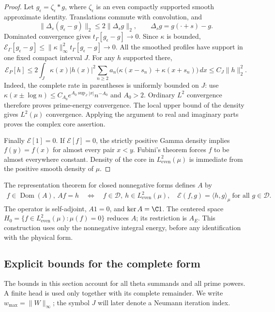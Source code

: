 \documentclass[11pt,a4paper]{article}
\numberwithin{equation}{section}
\theoremstyle{definition}\newtheorem{definition}[theorem]{Definition}
\theoremstyle{remark}\newtheorem{remark}[theorem]{Remark}
\newcommand{\E}{\mathcal E}\newcommand{\D}{\mathcal D}
\newcommand{\He}{L^2_{\mathrm{even}}(\mu)}\newcommand{\Le}{L^2_{\mathrm{even}}(dx)}
\newcommand{\tg}{t_\Gamma}\newcommand{\cg}{c_\Gamma}
\newcommand{\dom}{\operatorname{Dom}}\newcommand{\Var}{\operatorname{Var}}
\newcommand{\ip}[2]{\langle#1,#2\rangle}\newcommand{\norm}[1]{\lVert#1\rVert}\newcommand{\abs}[1]{\lvert#1\rvert}
\begin{document}
\begin{proof}
Let $g_\epsilon=\zeta_\epsilon*g$, where $\zeta_\epsilon$ is an even compactly supported smooth approximate identity. Translations commute with convolution, and
\[
 \norm{\Delta_s(g_\epsilon-g)}_2\le2\norm{\Delta_sg}_2,
 \qquad\Delta_sg=g(\cdot+s)-g.
\]
Dominated convergence gives $\tg[g_\epsilon-g]\to0$. Since $\kappa$ is bounded,
$\E_\Gamma[g_\epsilon-g]\le\norm{\kappa}_\infty^2\tg[g_\epsilon-g]\to0$.
All the smoothed profiles have support in one fixed compact interval $J$. For any $h$ supported there,
\begin{equation}\label{a:eq:compactprimerate}
 \E_P[h]\le2\int_J\kappa(x)|h(x)|^2
     \sum_{n\ge2}a_n\bigl(\kappa(x-s_n)+\kappa(x+s_n)\bigr)\,dx
 \le C_J\norm{h}_2^2.
\end{equation}
Indeed, the complete rate in parentheses is uniformly bounded on $J$: use $\kappa(x\pm\log n)\le C_{A_0}e^{A_0\sup_J|x|}n^{-A_0}$ and $A_0>2$. Ordinary $L^2$ convergence therefore proves prime-energy convergence. The local upper bound of the density gives $L^2(\mu)$ convergence. Applying the argument to real and imaginary parts proves the complex core assertion.

Finally $\E[1]=0$. If $\E[f]=0$, the strictly positive Gamma density implies $f(y)=f(x)$ for almost every pair $x<y$. Fubini's theorem forces $f$ to be almost everywhere constant. Density of the core in $\He$ is immediate from the positive smooth density of $\mu$.
\end{proof}

The representation theorem for closed nonnegative forms \cite[Chapter~VI, Section~2]{Kato} defines $A$ by
\begin{equation}\label{a:eq:Adef}
 \begin{split}
 f\in\dom(A),\ Af=h\quad\Longleftrightarrow\quad
 f\in\D,\ h\in\He,\quad
 \E(f,g)=\ip{h}{g}_\mu\ \text{for all }g\in\D.
 \end{split}
\end{equation}
The operator is self-adjoint, $A1=0$, and $\ker A=\C1$. The centered space
$H_0=\{f\in\He:\mu(f)=0\}$ reduces $A$; its restriction is $A_E$. This construction uses only the nonnegative integral energy, before any identification with the physical form.


\subsection{Explicit bounds for the complete form}\label{a:sec:prime}

The bounds in this section account for all theta summands and all prime powers. A finite head is used only together with its complete remainder. We write $w_{\max}=\norm W_\infty$; the symbol $J$ will later denote a Neumann iteration index.
\end{document}
